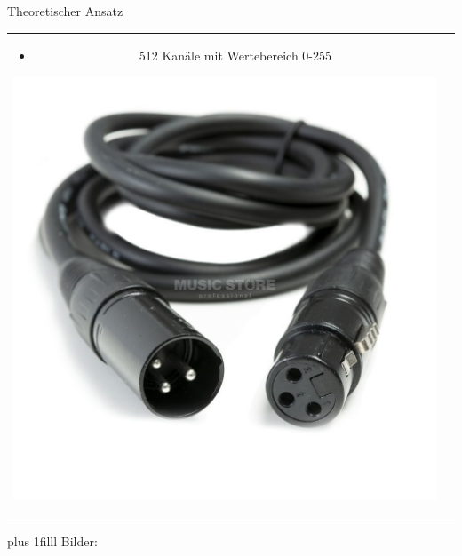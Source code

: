 \documentclass[Nike]{tuberlinbeamer}
\newcommand{\customcite}[1]{
	\vskip0pt plus 1filll
	\color{grau}
	\raggedleft \tiny Bilder: \cite{#1}
}
\begin{document}
\begin{frame}{Theoretischer Ansatz}
\begin{tabular}{cl}
{\begin{itemize}
				\item 512 Kanäle mit Wertebereich 0-255
			\end{itemize}
			\vspace{3ex}
			\includegraphics[scale= 0.1]{pictures/dmx-cable}
		}
	\end{tabular}
	\customcite{dmx_demo, dmx_cable}
\end{frame}
\end{document}

